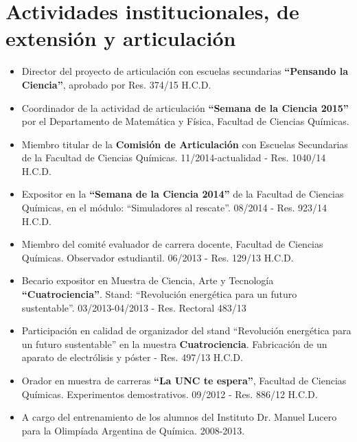 \documentclass[10pt]{article}
\begin{document}
\section{Actividades institucionales, de extensión y articulación}
\begin{itemize}
 \item Director del proyecto de articulación con escuelas secundarias {\bf ``Pensando la Ciencia''}, aprobado por Res. 374/15 H.C.D.
 \item Coordinador de la actividad de articulación {\bf ``Semana de la Ciencia 2015''} por el Departamento de Matemática y Física, Facultad de Ciencias Químicas.
 \item Miembro titular de la {\bf Comisión de Articulación} con Escuelas Secundarias de la Facultad de Ciencias Químicas.  11/2014-actualidad - Res. 1040/14 H.C.D.
 \item Expositor en la {\bf ``Semana de la Ciencia 2014''} de la Facultad de Ciencias Químicas, en el módulo: ``Simuladores al rescate''. 08/2014 - Res. 923/14 H.C.D. 
 \item { Miembro del comité evaluador de carrera docente}, Facultad de Ciencias Químicas. Observador estudiantil. 06/2013 - Res. 129/13 H.C.D. 
 \item  Becario expositor en Muestra de Ciencia, Arte y Tecnología {\bf ``Cuatrociencia''}. Stand: ``Revolución energética para un futuro sustentable''. 03/2013-04/2013 - Res. Rectoral 483/13 
 \item Participación en calidad de organizador del stand ``Revolución energética para un futuro sustentable'' en la muestra {\bf Cuatrociencia}. Fabricación de un aparato de electrólisis y póster - Res. 497/13 H.C.D.
 \item Orador en muestra de carreras {\bf ``La UNC te espera''}, Facultad de Ciencias Químicas. Experimentos demostrativos. 09/2012 - Res. 886/12 H.C.D.
 \item A cargo del entrenamiento de los alumnos del Instituto Dr. Manuel Lucero para la Olimpíada Argentina de Química. 2008-2013.
 \end{itemize}
 
\end{document}
